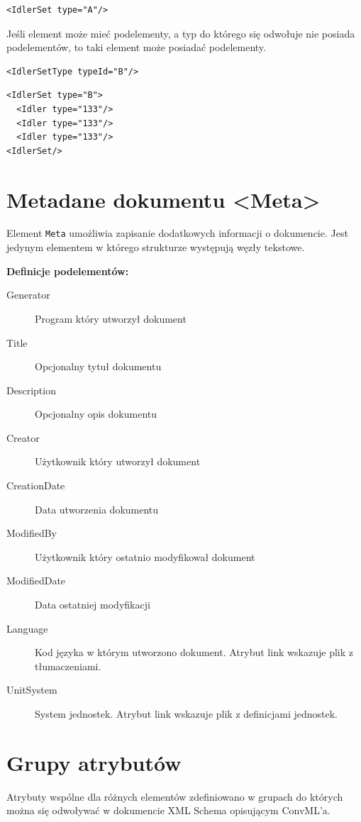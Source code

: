 \documentclass[12pt,a4paper]{article}
\begin{document}
\begin{verbatim}
<IdlerSet type="A"/>
\end{verbatim}

Jeśli element może mieć podelementy, a typ do którego się odwołuje nie posiada
podelementów, to taki element może posiadać podelementy.

\begin{verbatim}
<IdlerSetType typeId="B"/>
\end{verbatim}

\begin{verbatim}
<IdlerSet type="B">
  <Idler type="133"/>
  <Idler type="133"/>
  <Idler type="133"/>
<IdlerSet/>
\end{verbatim}

\section{Metadane dokumentu <Meta>}
Element {\tt Meta} umożliwia zapisanie dodatkowych informacji o dokumencie.
Jest jedynym elementem w którego strukturze występują węzły tekstowe.

\noindent\textbf{Definicje podelementów:}
\begin{description}
\item[Generator] Program który utworzył dokument
\item[Title] Opcjonalny tytuł dokumentu
\item[Description] Opcjonalny opis dokumentu
\item[Creator] Użytkownik który utworzył dokument
\item[CreationDate] Data utworzenia dokumentu
\item[ModifiedBy] Użytkownik który ostatnio modyfikował dokument
\item[ModifiedDate] Data ostatniej modyfikacji
\item[Language] Kod języka w którym utworzono dokument.
	Atrybut link wskazuje plik z tłumaczeniami.
\item[UnitSystem] System jednostek. Atrybut link wskazuje plik z definicjami jednostek. 
\end{description}

\section{Grupy atrybutów}
Atrybuty wspólne dla różnych elementów zdefiniowano w grupach do których można
się odwoływać w dokumencie XML Schema opisującym ConvML'a.
\end{document}
